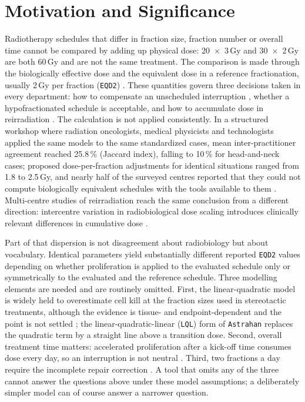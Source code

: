\documentclass[preprint,12pt,number]{elsarticle}
\begin{document}
\section{Motivation and Significance}
Radiotherapy schedules that differ in fraction size, fraction number or overall time cannot be compared by adding up physical dose: 20~$\times$~3\,Gy and
30~$\times$~2\,Gy are both 60\,Gy and are not the same treatment. The comparison is made through the biologically effective dose and the equivalent dose in a
reference fractionation, usually 2\,Gy per fraction (\texttt{EQD2}) \cite{fowler1989,fowler2010,jones2001,bentzen2012,voyant2017}. These quantities govern three decisions taken in every department: how to compensate an unscheduled interruption \cite{rcr2019,jones2020,oshea2022}, whether a hypofractionated schedule is acceptable, and how to accumulate dose in reirradiation \cite{appelt2026,hardcastle2024}. The calculation is not applied consistently. In a structured workshop where radiation oncologists, medical physicists and technologists applied the same models to the same standardized cases, mean inter-practitioner agreement reached 25.8\,\% (Jaccard index), falling to 10\,\% for head-and-neck cases; proposed dose-per-fraction adjustments for identical situations ranged from 1.8 to 2.5\,Gy, and nearly half of the surveyed centres reported that they could not compute biologically equivalent schedules with the tools available to them \cite{voyant2026standard,voyant2025}. Multi-centre studies of reirradiation reach the same conclusion from a different direction: intercentre variation in radiobiological dose scaling introduces clinically relevant differences in cumulative dose \cite{wahlstedt2026,hardcastle2024,stroom2025}. 

Part of that dispersion is not disagreement about radiobiology but about vocabulary. Identical parameters yield substantially different reported \texttt{EQD2}
values depending on whether proliferation is applied to the evaluated schedule only or symmetrically to the evaluated and the reference schedule. Three modelling elements are needed and are routinely omitted. First, the linear-quadratic model is widely held to overestimate cell kill at the fraction sizes used in stereotactic treatments, although the evidence is tissue- and endpoint-dependent and the point is not settled \cite{astrahan2008,guckenberger2013,brown2014}; the linear-quadratic-linear (\texttt{LQL}) form of \texttt{Astrahan} replaces the quadratic term by a straight line above a transition dose. Second, overall treatment time matters: accelerated proliferation after a kick-off time consumes dose every day, so an interruption is not neutral \cite{withers1988,dale1989,dale2024}. Third, two fractions a day require the incomplete repair correction \cite{thames1985}. A tool that omits any of the three cannot answer the questions above under these model assumptions; a deliberately simpler model can of course answer a narrower question. 
\end{document}
